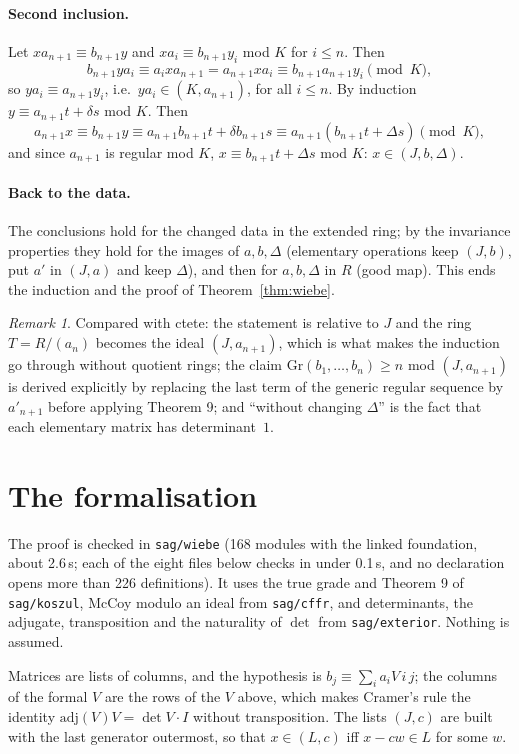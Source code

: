\documentclass[11pt]{amsart}
\theoremstyle{remark}
\newtheorem{remark}[theorem]{Remark}
\newcommand{\code}[1]{\texttt{#1}}
\newcommand{\Gr}{\mathrm{Gr}}
\newcommand{\adj}{\mathrm{adj}}
\begin{document}
\paragraph{Second inclusion.}  Let $xa_{n+1}\equiv b_{n+1}y$ and
$xa_i\equiv b_{n+1}y_i$ mod $K$ for $i\leq n$.  Then
\[
b_{n+1}ya_i\equiv a_ixa_{n+1}=a_{n+1}xa_i\equiv b_{n+1}a_{n+1}y_i\pmod K,
\]
so $ya_i\equiv a_{n+1}y_i$, i.e.\ $ya_i\in(K,a_{n+1})$, for all $i\leq n$.
By induction $y\equiv a_{n+1}t+\delta s$ mod $K$.  Then
\[
a_{n+1}x\equiv b_{n+1}y\equiv a_{n+1}b_{n+1}t+\delta b_{n+1}s\equiv
a_{n+1}(b_{n+1}t+\Delta s)\pmod K,
\]
and since $a_{n+1}$ is regular mod $K$, $x\equiv b_{n+1}t+\Delta s$ mod $K$:
$x\in(J,b,\Delta)$.

\paragraph{Back to the data.}  The conclusions hold for the changed data
in the extended ring; by the invariance properties they hold for the
images of $a,b,\Delta$ (elementary operations keep $(J,b)$, put $a'$ in
$(J,a)$ and keep $\Delta$), and then for $a,b,\Delta$ in $R$ (good map).
This ends the induction and the proof of Theorem~\ref{thm:wiebe}.

\begin{remark}
Compared with ctete: the statement is relative to $J$ and the ring
$T=R/(a_n)$ becomes the ideal $(J,a_{n+1})$, which is what makes the
induction go through without quotient rings; the claim
$\Gr(b_1,\dots,b_n)\geq n$ mod $(J,a_{n+1})$ is derived explicitly by
replacing the last term of the generic regular sequence by $a'_{n+1}$
before applying Theorem 9; and ``without changing $\Delta$'' is the fact
that each elementary matrix has determinant~$1$.
\end{remark}

\section{The formalisation}

The proof is checked in \code{sag/wiebe} (168 modules with the linked
foundation, about 2.6\,s; each of the eight files below checks in under
0.1\,s, and no declaration opens more than 226 definitions).  It uses the
true grade and Theorem 9 of \code{sag/koszul}, McCoy modulo an ideal from
\code{sag/cffr}, and determinants, the adjugate, transposition and the
naturality of $\det$ from \code{sag/exterior}.  Nothing is assumed.

Matrices are lists of columns, and the hypothesis is
$b_j\equiv\sum_ia_iV\,i\,j$; the columns of the formal $V$ are the rows of
the $V$ above, which makes Cramer's rule the identity
$\adj(V)V=\det V\cdot I$ without transposition.  The lists $(J,c)$ are
built with the last generator outermost, so that $x\in(L,c)$ iff
$x-cw\in L$ for some $w$.
\end{document}

